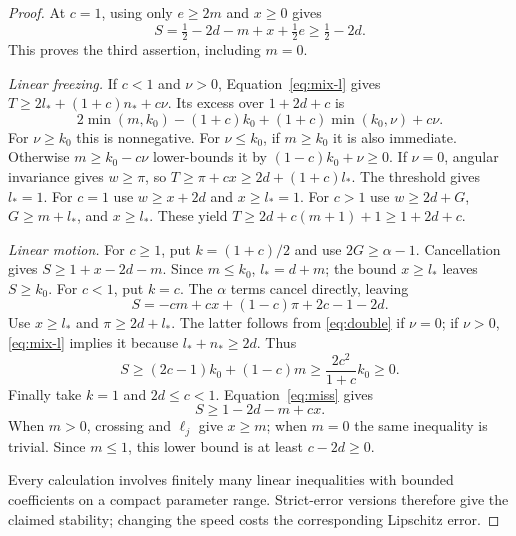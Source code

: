 \begin{proof}
At $c=1$, using only $e\geq2m$ and
$x\geq0$ gives
\[
 S=\tfrac12-2d-m+x+\tfrac12e
       \geq\tfrac12-2d.
\]
This proves the third assertion,
including $m=0$.

\emph{Linear freezing.}
If $c<1$ and $\nu>0$, Equation~\eqref{eq:mix-l}
gives
$T\geq2l_*+(1+c)n_*+c\nu$. Its excess
over $1+2d+c$ is
\[
 2\min(m,k_0)-(1+c)k_0
       +(1+c)\min(k_0,\nu)+c\nu.
\]
For $\nu\geq k_0$ this is nonnegative.
For $\nu\leq k_0$, if $m\geq k_0$
it is also immediate. Otherwise
$m\geq k_0-c\nu$ lower-bounds it by
$(1-c)k_0+\nu\geq0$.
If $\nu=0$, angular invariance gives
$w\geq\pi$, so
$T\geq\pi+cx\geq2d+(1+c)l_*$.
The threshold gives $l_*=1$.
For $c=1$ use $w\geq x+2d$ and
$x\geq l_*=1$. For $c>1$ use
$w\geq2d+G$, $G\geq m+l_*$,
and $x\geq l_*$. These yield
$T\geq2d+c(m+1)+1\geq1+2d+c$.

\emph{Linear motion.}
For $c\geq1$, put $k=(1+c)/2$ and
use $2G\geq\alpha-1$. Cancellation
gives $S\geq1+x-2d-m$.
Since $m\leq k_0$, $l_*=d+m$;
the bound $x\geq l_*$ leaves $S\geq k_0$.
For $c<1$, put $k=c$. The $\alpha$
terms cancel directly, leaving
\[
 S=-cm+cx+(1-c)\pi+2c-1-2d.
\]
Use $x\geq l_*$ and
$\pi\geq2d+l_*$. The latter follows
from \eqref{eq:double} if $\nu=0$;
if $\nu>0$, \eqref{eq:mix-l} implies it
because $l_*+n_*\geq2d$. Thus
\[
 S\geq(2c-1)k_0+(1-c)m
   \geq\frac{2c^2}{1+c}k_0\geq0.
\]
Finally take $k=1$ and $2d\leq c<1$.
Equation~\eqref{eq:miss} gives
\[
 S\geq1-2d-m+cx.
\]
When $m>0$, crossing and $\ell_j$
give $x\geq m$; when $m=0$ the
same inequality is trivial. Since
$m\leq1$, this lower bound is at
least $c-2d\geq0$.

Every calculation involves finitely
many linear inequalities with bounded
coefficients on a compact parameter
range. Strict-error versions therefore
give the claimed stability; changing
the speed costs the corresponding
Lipschitz error.
\end{proof}

